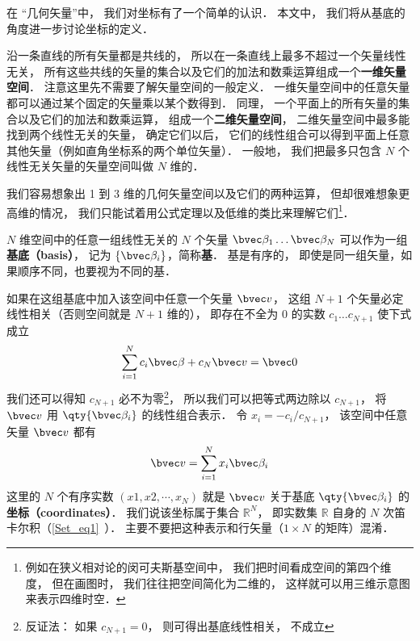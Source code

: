 
\begin{issues}
\issueTODO
\end{issues}


在 “几何矢量”中， 我们对坐标有了一个简单的认识． 本文中， 我们将从基底的角度进一步讨论坐标的定义． 

沿一条直线的所有矢量都是共线的， 所以在一条直线上最多不超过一个矢量线性无关， 所有这些共线的矢量的集合以及它们的加法和数乘运算组成一个\textbf{一维矢量空间}． 注意这里先不需要了解矢量空间的一般定义． 一维矢量空间中的任意矢量都可以通过某个固定的矢量乘以某个数得到． 同理， 一个平面上的所有矢量的集合以及它们的加法和数乘运算， 组成一个\textbf{二维矢量空间}， 二维矢量空间中最多能找到两个线性无关的矢量， 确定它们以后， 它们的线性组合可以得到平面上任意其他矢量（例如直角坐标系的两个单位矢量）． 一般地， 我们把最多只包含 $N$ 个线性无关矢量的矢量空间叫做 $N$ 维的．

我们容易想象出 1 到 3 维的几何矢量空间以及它们的两种运算， 但却很难想象更高维的情况， 我们只能试着用公式定理以及低维的类比来理解它们\footnote{例如在狭义相对论的闵可夫斯基空间中， 我们把时间看成空间的第四个维度， 但在画图时， 我们往往把空间简化为二维的， 这样就可以用三维示意图来表示四维时空．}．

$N$ 维空间中的任意一组线性无关的 $N$ 个矢量 $\bvec \beta_1\dots \bvec \beta_N$ 可以作为一组\textbf{基底（basis）}， 记为 $\{\bvec \beta_i\}$，简称\textbf{基}． 基是有序的， 即使是同一组矢量，如果顺序不同，也要视为不同的基．

如果在这组基底中加入该空间中任意一个矢量 $\bvec v$， 这组 $N+1$ 个矢量必定线性相关（否则空间就是 $N+1$ 维的）， 即存在不全为 0 的实数 $c_1\dots c_{N+1}$ 使下式成立
\begin{equation}
\sum_{i=1}^{N} c_i \bvec \beta + c_N \bvec v = \bvec 0
\end{equation}
我们还可以得知 $c_{N+1}$ 必不为零\footnote{反证法： 如果 $c_{N+1} = 0$， 则可得出基底线性相关， 不成立}， 所以我们可以把等式两边除以 $c_{N+1}$， 将 $\bvec v$ 用 $\qty{\bvec \beta_i}$ 的线性组合表示． 令 $x_i = -c_i/c_{N+1}$， 该空间中任意矢量 $\bvec v$ 都有
\begin{equation}\label{Gvec2_eq5}
\bvec v = \sum_{i=1}^N x_i \bvec \beta_i
\end{equation}
这里的 $N$ 个有序实数 $(x1, x2, \cdots, x_N)$ 就是 $\bvec v$ 关于基底 $\qty{\bvec \beta_i}$ 的\textbf{坐标（coordinates）}． 我们说该坐标属于集合 $\mathbb R^N$， 即实数集 $\mathbb R$ 自身的 $N$ 次笛卡尔积（\autoref{Set_eq1}~）． 主要不要把这种表示和行矢量（$1\times N$ 的矩阵）混淆．

